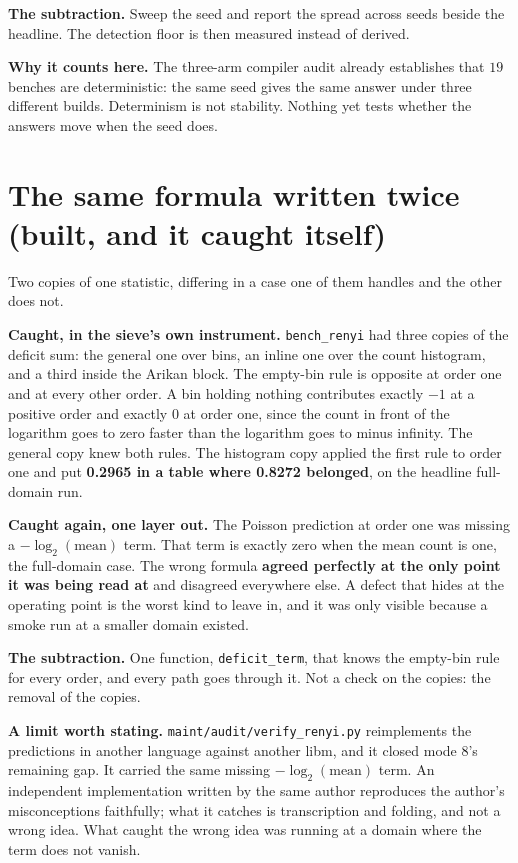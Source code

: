\textbf{The subtraction.} Sweep the seed and report the spread across seeds beside the headline. The detection floor is then measured instead of derived.

\textbf{Why it counts here.} The three-arm compiler audit already establishes that \(19\) benches are deterministic: the same seed gives the same answer under three different builds. Determinism is not stability. Nothing yet tests whether the answers move when the seed does.

\section{The same formula written twice (built, and it caught itself)}

Two copies of one statistic, differing in a case one of them handles and the other does not.

\textbf{Caught, in the sieve's own instrument.} \texttt{bench\_renyi} had three copies of the deficit sum: the general one over bins, an inline one over the count histogram, and a third inside the Arikan block. The empty-bin rule is opposite at order one and at every other order. A bin holding nothing contributes exactly \(-1\) at a positive order and exactly \(0\) at order one, since the count in front of the logarithm goes to zero faster than the logarithm goes to minus infinity. The general copy knew both rules. The histogram copy applied the first rule to order one and put \textbf{0.2965 in a table where 0.8272 belonged}, on the headline full-domain run.

\textbf{Caught again, one layer out.} The Poisson prediction at order one was missing a \(-\log_2(\mathrm{mean})\) term. That term is exactly zero when the mean count is one, the full-domain case. The wrong formula \textbf{agreed perfectly at the only point it was being read at} and disagreed everywhere else. A defect that hides at the operating point is the worst kind to leave in, and it was only visible because a smoke run at a smaller domain existed.

\textbf{The subtraction.} One function, \texttt{deficit\_term}, that knows the empty-bin rule for every order, and every path goes through it. Not a check on the copies: the removal of the copies.

\textbf{A limit worth stating.} \texttt{maint/\allowbreak{}audit/\allowbreak{}verify\_renyi.py} reimplements the predictions in another language against another libm, and it closed mode 8's remaining gap. It carried the same missing \(-\log_2(\mathrm{mean})\) term. An independent implementation written by the same author reproduces the author's misconceptions faithfully; what it catches is transcription and folding, and not a wrong idea. What caught the wrong idea was running at a domain where the term does not vanish.

